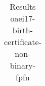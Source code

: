 \begin{table}[htb]
{\begin{tabular}[tb]{llllllllllllllllllllllllllllllllllllllll}
\end{tabular}

}

\caption{Results oaei17-birth-certificate-non-binary-fpfn}

\label{tbl:results}

\end{table}
